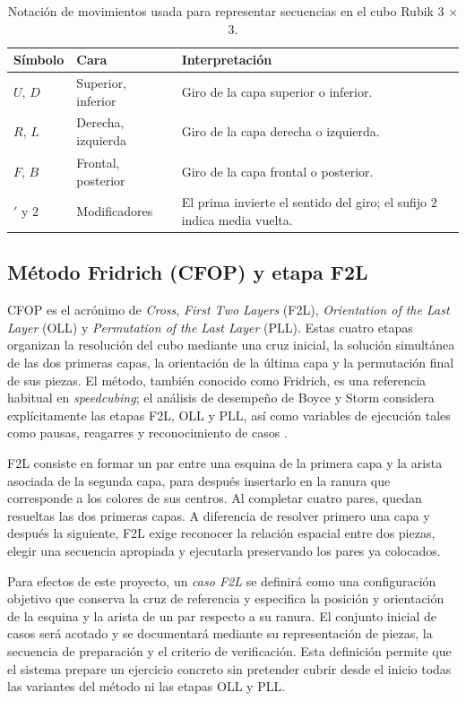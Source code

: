 \begin{table}[H]
\centering
\footnotesize
\renewcommand{\arraystretch}{1.0}
\begin{tabularx}{\textwidth}{|p{2.4cm}|p{2.5cm}|X|}
\hline
\textbf{Símbolo} & \textbf{Cara} & \textbf{Interpretación} \\ \hline
$U$, $D$ & Superior, inferior & Giro de la capa superior o inferior. \\ \hline
$R$, $L$ & Derecha, izquierda & Giro de la capa derecha o izquierda. \\ \hline
$F$, $B$ & Frontal, posterior & Giro de la capa frontal o posterior. \\ \hline
$'$ y $2$ & Modificadores & El prima invierte el sentido del giro; el sufijo $2$ indica media vuelta. \\ \hline
\end{tabularx}
\caption{\small Notación de movimientos usada para representar secuencias en el cubo Rubik 3 $\times$ 3.}
\label{tab:notacion-cubo}
\end{table}

\subsection{Método Fridrich (CFOP) y etapa F2L}

CFOP es el acrónimo de \textit{Cross}, \textit{First Two Layers} (F2L), \textit{Orientation of the Last Layer} (OLL) y \textit{Permutation of the Last Layer} (PLL). Estas cuatro etapas organizan la resolución del cubo mediante una cruz inicial, la solución simultánea de las dos primeras capas, la orientación de la última capa y la permutación final de sus piezas. El método, también conocido como Fridrich, es una referencia habitual en \textit{speedcubing}; el análisis de desempeño de Boyce y Storm considera explícitamente las etapas F2L, OLL y PLL, así como variables de ejecución tales como pausas, reagarres y reconocimiento de casos \cite{Boyce2022}.

F2L consiste en formar un par entre una esquina de la primera capa y la arista asociada de la segunda capa, para después insertarlo en la ranura que corresponde a los colores de sus centros. Al completar cuatro pares, quedan resueltas las dos primeras capas. A diferencia de resolver primero una capa y después la siguiente, F2L exige reconocer la relación espacial entre dos piezas, elegir una secuencia apropiada y ejecutarla preservando los pares ya colocados.

Para efectos de este proyecto, un \emph{caso F2L} se definirá como una configuración objetivo que conserva la cruz de referencia y especifica la posición y orientación de la esquina y la arista de un par respecto a su ranura. El conjunto inicial de casos será acotado y se documentará mediante su representación de piezas, la secuencia de preparación y el criterio de verificación. Esta definición permite que el sistema prepare un ejercicio concreto sin pretender cubrir desde el inicio todas las variantes del método ni las etapas OLL y PLL.

